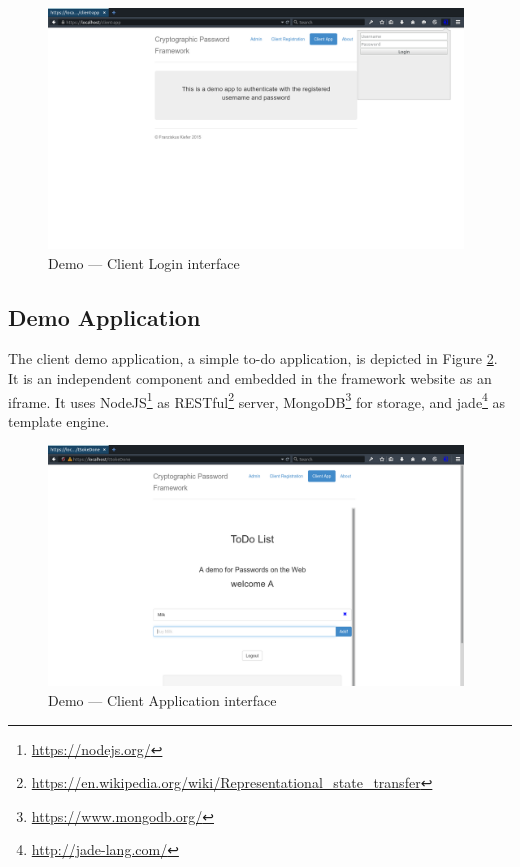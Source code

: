 \begin{figure}[tbph]
\centering
\includegraphics[width=0.98\textwidth]{Figs/demo-login-popup.png}
\caption{Demo --- Client Login interface}\label{fig:demo-login}
\end{figure}

\subsection{Demo Application}
The client demo application, a simple to-do application, is depicted in Figure \ref{fig:demo-app}.
It is an independent component and embedded in the framework website as an iframe.
It uses NodeJS\footnote{\url{https://nodejs.org/}} as RESTful\footnote{\url{https://en.wikipedia.org/wiki/Representational_state_transfer}} server, MongoDB\footnote{\url{https://www.mongodb.org/}} for storage, and jade\footnote{\url{http://jade-lang.com/}} as template engine.

\begin{figure}[tbph]
\centering
\includegraphics[width=0.98\textwidth]{Figs/demo-app.png}
\caption{Demo --- Client Application interface}\label{fig:demo-app}
\end{figure}
